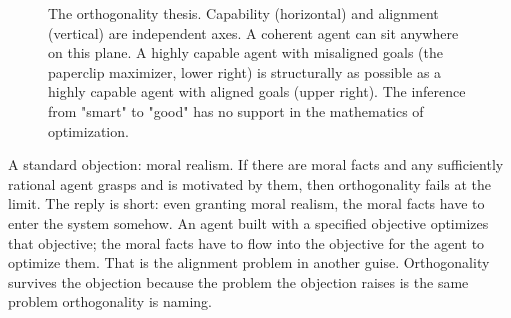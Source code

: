 \begin{figure}[h]
\centering
{}
\caption{The orthogonality thesis. Capability (horizontal) and alignment (vertical) are independent axes. A coherent agent can sit anywhere on this plane. A highly capable agent with misaligned goals (the paperclip maximizer, lower right) is structurally as possible as a highly capable agent with aligned goals (upper right). The inference from "smart" to "good" has no support in the mathematics of optimization.}
\label{fig:orthogonality}
\end{figure}

A standard objection: moral realism. If there are moral facts and any sufficiently rational agent grasps and is motivated by them, then orthogonality fails at the limit. The reply is short: even granting moral realism, the moral facts have to enter the system somehow. An agent built with a specified objective optimizes that objective; the moral facts have to flow into the objective for the agent to optimize them. That is the alignment problem in another guise. Orthogonality survives the objection because the problem the objection raises is the same problem orthogonality is naming.

